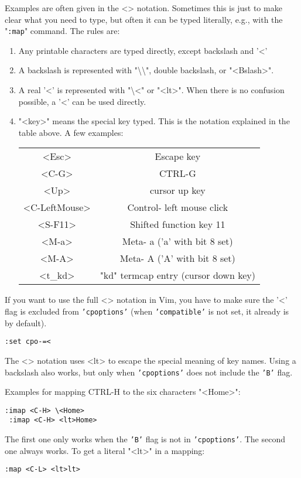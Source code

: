 \begin{description}
\label{<>}
Examples are often given in the <> notation.
Sometimes this is just to make clear what you need to type, but often it can be typed literally, e.g., with the "\texttt{:map}" command.
The rules are:
\begin{enumerate}
				\item Any printable characters are typed directly, except backslash and '<'
				\item A backslash is represented with "\textbackslash\textbackslash", double backslash, or "<Bslash>".
				\item A real '<' is represented with "\textbackslash<" or "<lt>".  When there is no
								confusion possible, a '<' can be used directly.
				\item "<key>" means the special key typed.  This is the notation explained in
								the table above.  A few examples:
								\begin{center}
												\begin{tabular}{c c}
																<Esc> & Escape key\\
																<C-G> & CTRL-G\\
																<Up> & cursor up key\\
																<C-LeftMouse> & Control- left mouse click\\
																<S-F11> & Shifted function key 11\\
																<M-a> & Meta- a  ('a' with bit 8 set)\\
																<M-A> & Meta- A  ('A' with bit 8 set)\\
																<t\_kd> & "kd" termcap entry (cursor down key)\\
												\end{tabular}
								\end{center}
\end{enumerate}
\end{description}

If you want to use the full <> notation in Vim, you have to make sure the '<' flag is excluded from \texttt{'cpoptions'} (when \texttt{'compatible'} is not set, it already is by default).
\begin{Verbatim}[samepage=true]
 :set cpo-=<
\end{Verbatim}
The <> notation uses <lt> to escape the special meaning of key names.
Using a backslash also works, but only when \texttt{'cpoptions'} does not include the \texttt{'B'} flag.

Examples for mapping CTRL-H to the six characters "<Home>":
\begin{Verbatim}[samepage=true]
 :imap <C-H> \<Home>
 :imap <C-H> <lt>Home>
\end{Verbatim}
The first one only works when the \texttt{'B'} flag is not in \texttt{'cpoptions'}.
The second one always works.
To get a literal "<lt>" in a mapping:
\begin{Verbatim}[samepage=true]
 :map <C-L> <lt>lt>
\end{Verbatim}

